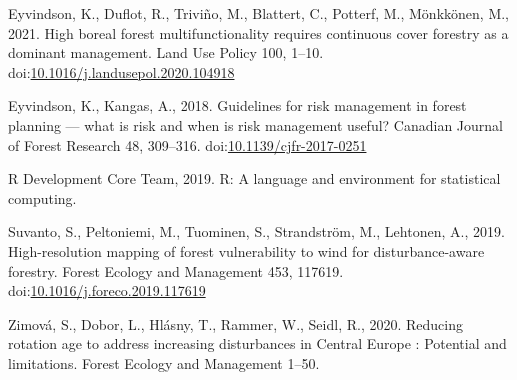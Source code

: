 \documentclass[]{elsarticle} %
\begin{document}
\hypertarget{ref-Eyvindson2020}{}
Eyvindson, K., Duflot, R., Triviño, M., Blattert, C., Potterf, M.,
Mönkkönen, M., 2021. High boreal forest multifunctionality requires
continuous cover forestry as a dominant management. Land Use Policy 100,
1--10.
doi:\href{https://doi.org/10.1016/j.landusepol.2020.104918}{10.1016/j.landusepol.2020.104918}

\hypertarget{ref-Eyvindson2018}{}
Eyvindson, K., Kangas, A., 2018. Guidelines for risk management in
forest planning --- what is risk and when is risk management useful?
Canadian Journal of Forest Research 48, 309--316.
doi:\href{https://doi.org/10.1139/cjfr-2017-0251}{10.1139/cjfr-2017-0251}

\hypertarget{ref-RDevelopmentCoreTeam2019}{}
R Development Core Team, 2019. R: A language and environment for
statistical computing.

\hypertarget{ref-Suvanto2019}{}
Suvanto, S., Peltoniemi, M., Tuominen, S., Strandström, M., Lehtonen,
A., 2019. High-resolution mapping of forest vulnerability to wind for
disturbance-aware forestry. Forest Ecology and Management 453, 117619.
doi:\href{https://doi.org/10.1016/j.foreco.2019.117619}{10.1016/j.foreco.2019.117619}

\hypertarget{ref-Zimova2020}{}
Zimová, S., Dobor, L., Hlásny, T., Rammer, W., Seidl, R., 2020. Reducing
rotation age to address increasing disturbances in Central Europe :
Potential and limitations. Forest Ecology and Management 1--50.
\end{document}
